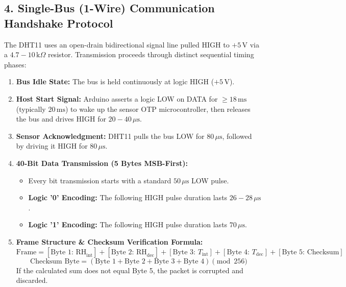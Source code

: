 \documentclass[11pt,a4paper]{article}
\begin{document}
\subsection*{4. Single-Bus (1-Wire) Communication Handshake Protocol}
The DHT11 uses an open-drain bidirectional signal line pulled HIGH to $+5\,\text{V}$ via a $4.7-10\,\text{k}\Omega$ resistor. Transmission proceeds through distinct sequential timing phases:
\begin{enumerate}[leftmargin=*]
    \item \textbf{Bus Idle State:} The bus is held continuously at logic HIGH ($+5\,\text{V}$).
    \item \textbf{Host Start Signal:} Arduino asserts a logic LOW on DATA for $\ge 18\,\text{ms}$ (typically $20\,\text{ms}$) to wake up the sensor OTP microcontroller, then releases the bus and drives HIGH for $20-40\,\mu\text{s}$.
    \item \textbf{Sensor Acknowledgment:} DHT11 pulls the bus LOW for $80\,\mu\text{s}$, followed by driving it HIGH for $80\,\mu\text{s}$.
    \item \textbf{40-Bit Data Transmission (5 Bytes MSB-First):}
    \begin{itemize}[noitemsep]
        \item Every bit transmission starts with a standard $50\,\mu\text{s}$ LOW pulse.
        \item \textbf{Logic '0' Encoding:} The following HIGH pulse duration lasts $26-28\,\mu\text{s}$.
        \item \textbf{Logic '1' Encoding:} The following HIGH pulse duration lasts $70\,\mu\text{s}$.
    \end{itemize}
    \item \textbf{Frame Structure \& Checksum Verification Formula:}
    \begin{equation}
    \text{Frame} = [\text{Byte 1: RH}_{\text{int}}] + [\text{Byte 2: RH}_{\text{dec}}] + [\text{Byte 3: } T_{\text{int}}] + [\text{Byte 4: } T_{\text{dec}}] + [\text{Byte 5: Checksum}]
    \end{equation}
    \begin{equation}
    \text{Checksum Byte} = (\text{Byte 1} + \text{Byte 2} + \text{Byte 3} + \text{Byte 4}) \pmod{256}
    \end{equation}
    If the calculated sum does not equal Byte 5, the packet is corrupted and discarded.
\end{enumerate}
\end{document}
